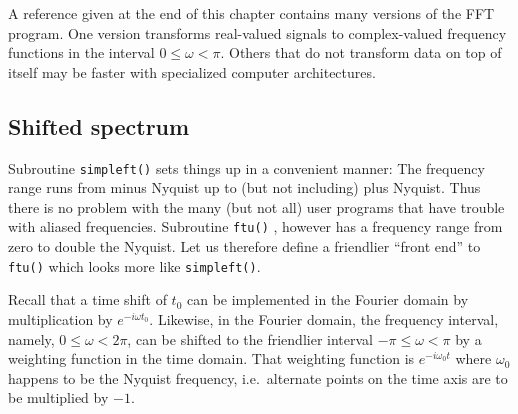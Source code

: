 A reference given at the end of this chapter
contains many %
versions of the FFT program.
One version transforms real-valued signals to complex-valued
frequency functions in the interval $0 \le \omega < \pi$.
Others that do not transform data on top of itself
may be faster with specialized computer architectures.

\subsection{Shifted spectrum}
Subroutine \texttt{simpleft()} 
sets things up in a convenient manner:
The frequency range runs from minus Nyquist
up to (but not including) plus Nyquist.
Thus there is no problem with the many (but not all)
user programs that have trouble with aliased frequencies.
Subroutine \texttt{ftu()} , however has a frequency range
from zero to double the Nyquist.
Let us therefore define a friendlier ``front end'' to {\tt ftu()}
which looks more like {\tt simpleft()}.

\par
Recall that a time shift of $t_0$ can be implemented in 
the Fourier domain by multiplication by
$e^{-i\omega t_0}$.
Likewise, in the Fourier domain,
the frequency interval, 
namely, $ 0 \le \omega < 2\pi$,
can be shifted to the friendlier interval
$ -\pi \le \omega < \pi$
by a weighting function in the time domain.
That weighting function is $e^{-i\omega_0 t}$
where $\omega_0$ happens to be the Nyquist frequency,
i.e.~alternate points on the time axis are to be multiplied by $-1$.
\begin{comment}
A subroutine for this purpose is {\tt fth()}.
\progdex{fth}{FT, Hale style}
\newslide
\par
\noindent
To Fourier transform a 1024-point complex vector {\tt cx(1024)}
and then inverse transform it, we would write
\begin{verbatim}
call fth( 0, 1., 1, 1024, cx)
call fth( 1, 1., 1, 1024, cx)
\end{verbatim}
\noindent
You might wonder about the apparent redundancy of using both
the argument {\tt adj} and the argument {\tt sign}.
Having two arguments instead of one allows
us to define the {\em  forward} transform for a {\em  time} axis
with the opposite sign as
             the      forward  transform for a {\em  space} axis.
\par
The subroutine {\tt fth()} is somewhat cluttered by
the inclusion of a
frequently needed practical feature---namely,
the facility to extract vectors from a matrix,
transform the vectors, and then restore them into the matrix.
\end{comment}

